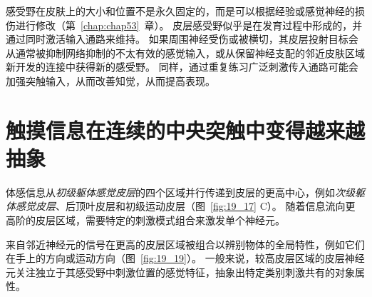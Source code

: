 感受野在皮肤上的大小和位置不是永久固定的，而是可以根据经验或感觉神经的损伤进行修改（第~\ref{chap:chap53}~章）。
皮层感受野似乎是在发育过程中形成的，并通过同时激活输入通路来维持。
如果周围神经受伤或被横切，其皮层投射目标会从通常被抑制网络抑制的不太有效的感觉输入，或从保留神经支配的邻近皮肤区域新开发的连接中获得新的感受野。
同样，通过重复练习广泛刺激传入通路可能会加强突触输入，从而改善知觉，从而提高表现。



\section{触摸信息在连续的中央突触中变得越来越抽象}

体感信息从\textit{初级躯体感觉皮层}的四个区域并行传递到皮层的更高中心，例如\textit{次级躯体感觉皮层}、后顶叶皮层和初级运动皮层（图~\ref{fig:19_17} C）。
随着信息流向更高阶的皮层区域，需要特定的刺激模式组合来激发单个神经元。


来自邻近神经元的信号在更高的皮层区域被组合以辨别物体的全局特性，例如它们在手上的方向或运动方向（图~\ref{fig:19_19}）。
一般来说，较高皮层区域的皮层神经元关注独立于其感受野中刺激位置的感觉特征，抽象出特定类别刺激共有的对象属性。


